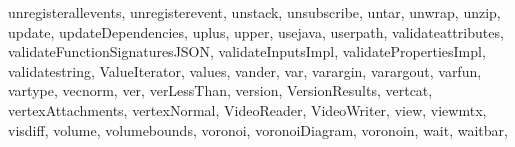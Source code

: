 {{        unregisterallevents,%
        unregisterevent,%
        unstack,%
        unsubscribe,%
        untar,%
        unwrap,%
        unzip,%
        update,%
        updateDependencies,%
        uplus,%
        upper,%
        usejava,%
        userpath,%
        validateattributes,%
        validateFunctionSignaturesJSON,%
        validateInputsImpl,%
        validatePropertiesImpl,%
        validatestring,%
        ValueIterator,%
        values,%
        vander,%
        var,%
        varargin,%
        varargout,%
        varfun,%
        vartype,%
        vecnorm,%
        ver,%
        verLessThan,%
        version,%
        VersionResults,%
        vertcat,%
        vertexAttachments,%
        vertexNormal,%
        VideoReader,%
        VideoWriter,%
        view,%
        viewmtx,%
        visdiff,%
        volume,%
        volumebounds,%
        voronoi,%
        voronoiDiagram,%
        voronoin,%
        wait,%
        waitbar,%
}}
